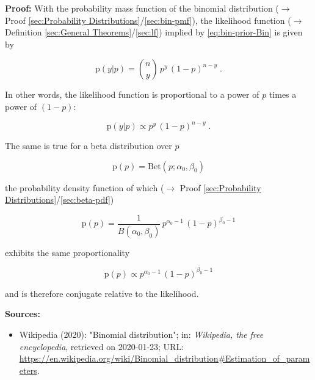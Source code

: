 \documentclass[a4paper,12pt,twoside]{book}
\begin{document}
\vspace{1em}
\textbf{Proof:} With the probability mass function of the binomial distribution ($\rightarrow$ Proof \ref{sec:Probability Distributions}/\ref{sec:bin-pmf}), the likelihood function ($\rightarrow$ Definition \ref{sec:General Theorems}/\ref{sec:lf}) implied by \eqref{eq:bin-prior-Bin} is given by

\begin{equation} \label{eq:bin-prior-Bin-LF}
\mathrm{p}(y|p) = {n \choose y} \, p^y \, (1-p)^{n-y} \; .
\end{equation}

In other words, the likelihood function is proportional to a power of $p$ times a power of $(1-p)$:

\begin{equation} \label{eq:bin-prior-Bin-LF-prop}
\mathrm{p}(y|p) \propto p^y \, (1-p)^{n-y} \; .
\end{equation}

The same is true for a beta distribution over $p$

\begin{equation} \label{eq:bin-prior-Bin-prior-s1}
\mathrm{p}(p) = \mathrm{Bet}(p; \alpha_0, \beta_0)
\end{equation}

the probability density function of which ($\rightarrow$ Proof \ref{sec:Probability Distributions}/\ref{sec:beta-pdf})

\begin{equation} \label{eq:bin-prior-Bin-prior-s2}
\mathrm{p}(p) = \frac{1}{B(\alpha_0,\beta_0)} \, p^{\alpha_0-1} \, (1-p)^{\beta_0-1}
\end{equation}

exhibits the same proportionality

\begin{equation} \label{eq:bin-prior-Bin-prior-s3}
\mathrm{p}(p) \propto p^{\alpha_0-1} \, (1-p)^{\beta_0-1}
\end{equation}

and is therefore conjugate relative to the likelihood.


\vspace{1em}
\textbf{Sources:}
\begin{itemize}
\item Wikipedia (2020): "Binomial distribution"; in: \textit{Wikipedia, the free encyclopedia}, retrieved on 2020-01-23; URL: \url{https://en.wikipedia.org/wiki/Binomial_distribution#Estimation_of_parameters}.
\end{itemize}
\end{document}
